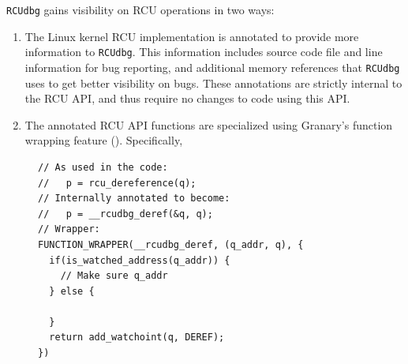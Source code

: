 \documentclass[preprint]{sigplanconf}
\begin{document}


\texttt{RCUdbg} gains visibility on RCU operations in two ways: \begin{enumerate}
	\item The Linux kernel RCU implementation is annotated to provide more information to \texttt{RCUdbg}. This information includes source code file and line information for bug reporting, and additional memory references that \texttt{RCUdbg} uses to get better visibility on bugs. These annotations are strictly internal to the RCU API, and thus require no changes to code using this API.
	\item The annotated RCU API functions are specialized using Granary's function wrapping feature (). Specifically, 
\end{enumerate}





\begin{figure}[t!]
\lstset{language=C, tabsize=2, stepnumber=1}
\begin{lstlisting}[basicstyle=\footnotesize\ttfamily]
// As used in the code:
//   p = rcu_dereference(q);
// Internally annotated to become:
//   p = __rcudbg_deref(&q, q);
// Wrapper:
FUNCTION_WRAPPER(__rcudbg_deref, (q_addr, q), {
  if(is_watched_address(q_addr)) {
    // Make sure q_addr
  } else {

  }
  return add_watchoint(q, DEREF);
})
\end{lstlisting}
\caption{}
\label{fig:rcu_dereference_wrapper}
\end{figure}
\end{document}
